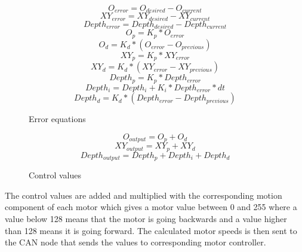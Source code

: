 \begin{center}
\begin{figure}[!ht]
\begin{equation}
O_{error}=O_{desired}-O_{current}
\label{pid_eq1}
\end{equation}
\begin{equation}
XY_{error}=XY_{desired}-XY_{current}
\end{equation}
\begin{equation}
Depth_{error}=Depth_{desired}-Depth_{current}
\end{equation}
\begin{equation}
O_{p}=K_{p}*O_{error}
\end{equation}
\begin{equation}
O_{d}=K_{d}*(O_{error} - O_{previous})
\end{equation}
\begin{equation}
XY_{p}=K_{p}*XY_{error}
\end{equation}
\begin{equation}
XY_{d}=K_{d}*(XY_{error} - XY_{previous})
\end{equation}
\begin{equation}
Depth_{p}=K_{p}*Depth_{error}
\end{equation}
\begin{equation}
Depth_{i}=Depth_{i} + K_{i}*Depth_{error}*dt
\end{equation}
\begin{equation}
Depth_{d}=K_{d}*(Depth_{error} - Depth_{previous})
\end{equation}
\caption{Error equations}
\end{figure}
\end{center}


\begin{center}
\begin{figure}[!ht]
\begin{equation}
O_{output}=O_{p}+O_{d}
\end{equation}
\begin{equation}
XY_{output}=XY_{p}+XY_{d}
\end{equation}
\begin{equation}
Depth_{output}=Depth_{p}+Depth_{i}+Depth_{d}
\label{pid_eq2}
\end{equation}
\caption{Control values}
\end{figure}
\end{center}

The control values are added and multiplied with the corresponding motion component of each motor which gives a motor value between 0 and 255 where a value below 128 means that the motor is going backwards and a value higher than 128 means it is going forward. The calculated motor speeds is then sent to the CAN node that sends the values to corresponding motor controller.



